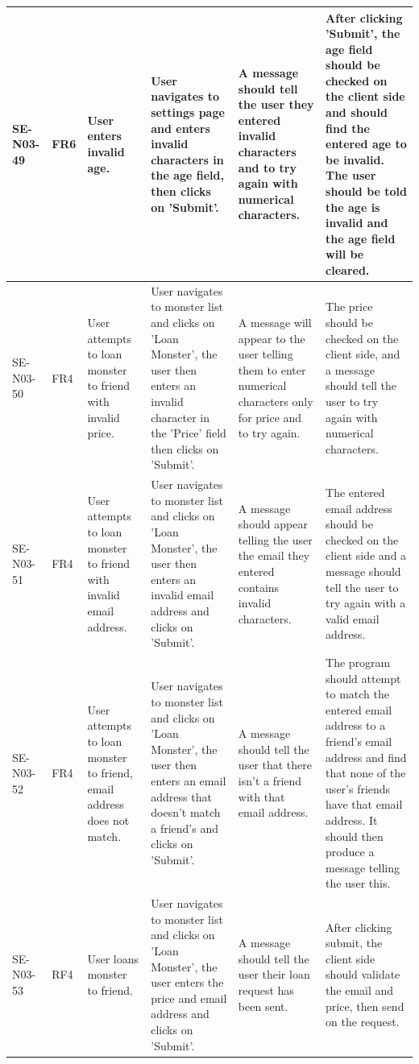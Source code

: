 \documentclass[a4paper]{article}
\begin{document}
\begin{landscape}
\clearpage

\begin{center}
\thispagestyle{empty}
	\begin{tabular}{| l | l | p{3cm} | p{3cm} | p{5cm} | p{7cm} |}
	\hline
	SE-N03-49 & FR6 & User enters invalid age. & User navigates to settings page and enters invalid characters in the age field, 	then clicks on 'Submit'. & A message should tell the user they entered 		invalid characters and to try again with numerical characters. & After clicking 'Submit', the age field should be checked on the client side and should find the entered age to be invalid. The user should be told the age is invalid and the age field will be cleared.\\
	\hline
	SE-N03-50 & FR4 & User attempts to loan monster to friend with invalid price. & User navigates to monster list and clicks on 'Loan Monster', the user then enters an invalid character in the 'Price' field then clicks on 'Submit'. & A message will appear to the user telling them to enter numerical characters only for price and to try again. & The price should be checked on the client side, and a message should tell the user to try again with numerical characters.\\
	\hline
	SE-N03-51 & FR4 & User attempts to loan monster to friend with invalid email address. & User navigates to monster list and clicks on 'Loan Monster', the user then enters an invalid email address and clicks on 'Submit'. & A message should appear telling the user the email they entered contains invalid characters. & The entered email address should be checked on the client side and a message should tell the user to try again with a valid email address.\\
	\hline
	SE-N03-52 & FR4 & User attempts to loan monster to friend, email address does not match. & User navigates to monster list and clicks on 'Loan Monster', the user then enters an email address that doesn't match a friend's and clicks on 'Submit'. & A message should tell the user that there isn't a friend with that email address. & The program should attempt to match the entered email address to a friend's email address and find that none of the user's friends have that email address. It should then produce a message telling the user this.\\
	\hline
	SE-N03-53 & RF4 & User loans monster to friend. & User navigates to monster list and clicks on 'Loan Monster', the user enters the price and email address and clicks on 'Submit'. & A message should tell the user their loan request has been sent. & After clicking submit, the client side should validate the email and price, then send on the request.\\
	\hline
\end{tabular}
\end{center}
\end{landscape}
\end{document}
